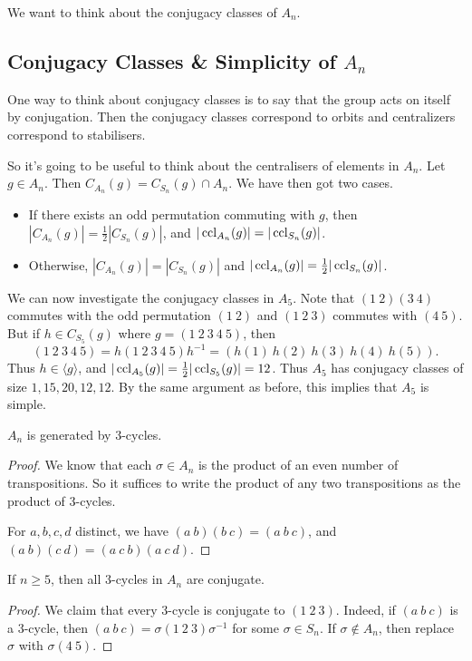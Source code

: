 \documentclass[a4paper]{scrartcl}
\begin{document}
We want to think about the conjugacy classes of $A_n$.

\subsection{Conjugacy Classes \& Simplicity of $A_n$}

One way to think about conjugacy classes is to say that the group acts on itself by conjugation. Then the conjugacy classes correspond to orbits and centralizers correspond to stabilisers.

So it's going to be useful to think about the centralisers of elements in $A_n$. 
Let $g \in A_n$. Then $C_{A_n}(g) = C_{S_n}(g) \cap A_n$. We have then got two cases.
\begin{itemize}
	\item If there exists an odd permutation commuting with $g$, then $|C_{A_n}(g)| = \frac{1}{2}|C_{S_n}(g)|$, and $|\operatorname{ccl}_{A_n}(g)| = |\operatorname{ccl}_{S_n}(g)|$.
	\item  Otherwise, $|C_{A_n}(g)| = |C_{S_n}(g)|$ and $|\operatorname{ccl}_{A_n}(g)| = \frac{1}{2}|\operatorname{ccl}_{S_n}(g)|$.
\end{itemize}

\begin{example}
	We can now investigate the conjugacy classes in $A_5$. Note that $(1\ 2)(3\ 4)$ commutes with the odd permutation $(1\ 2)$ and $(1\ 2\ 3)$ commutes with $(4\ 5)$. But if $h \in C_{S_5}(g)$ where $g = (1\ 2\ 3\ 4\ 5)$, then
	$$
(1\ 2\ 3\ 4\ 5) = h (1\ 2\ 3\ 4\ 5) h^{-1} = (h(1)\ h(2)\ h(3)\ h(4)\ h(5)).
	$$
	Thus $h \in \langle g \rangle$, and $|\operatorname{ccl}_{A_5}(g)| = \frac{1}{2}|\operatorname{ccl}_{S_5}(g)| = 12$. Thus $A_5$ has conjugacy classes of size $1, 15, 20, 12, 12$. By the same argument as before, this implies that $A_5$ is simple.
\end{example}

\begin{lemma}[Generators of $A_n$]
	$A_n$ is generated by 3-cycles.
\end{lemma}
\begin{proof}
	We know that each $\sigma \in A_n$ is the product of an even number of transpositions. So it suffices to write the product of any two transpositions as the product of 3-cycles. 

	For $a, b, c, d$ distinct, we have $(a\ b)(b\ c) = (a\ b\ c)$, and $(a\ b)(c\ d) = (a\ c\ b)(a\ c\ d)$.
\end{proof}

\begin{lemma}
	If $n \geq 5$, then all $3$-cycles in $A_n$ are conjugate.
\end{lemma}
\begin{proof}
	We claim that every 3-cycle is conjugate to $(1\ 2\ 3)$. Indeed, if $(a\ b\ c)$ is a 3-cycle, then $(a\ b\ c)=\sigma (1\ 2\ 3)\sigma^{-1}$ for some $\sigma \in S_n$. If $\sigma \not \in A_n$, then replace $\sigma$ with $\sigma (4\ 5)$.
\end{proof}
\end{document}
